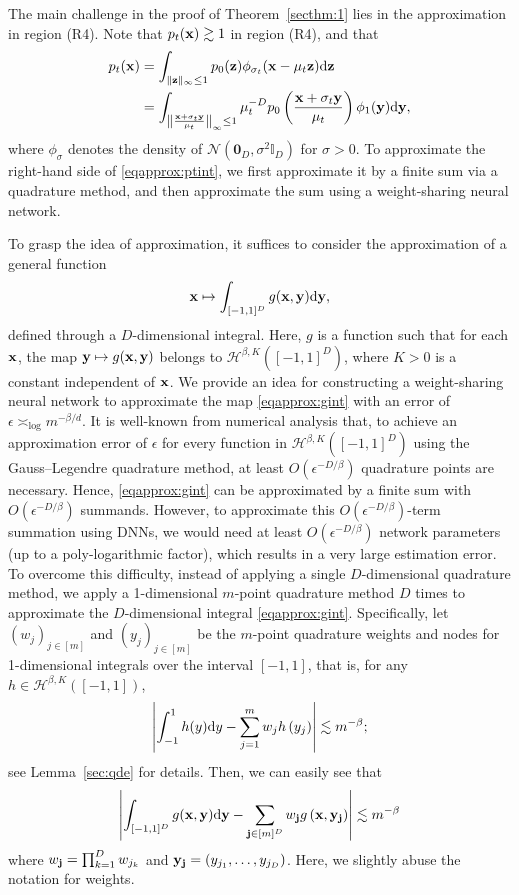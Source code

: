 \documentclass[twoside,11pt]{article}
\def\cH{\mathcal H}
\def\cN{\mathcal N}
\newcommand{\bj}{{\bf j}}
\newcommand{\bx}{{\bf x}}
\newcommand{\by}{{\bf y}}
\newcommand{\bz}{{\bf z}}
\newcommand{\bbI}{{\mathbb I}}
\newcommand{\be}{\begin{equation}}
\newcommand{\ee}{\end{equation}}
\newcommand{\bean}{\setlength\arraycolsep{1pt}\begin{eqnarray*}}
\newcommand{\eean}{\end{eqnarray*}}
\def\d{{\rm d}}
\begin{document}
The main challenge in the proof of Theorem~\ref{secthm:1} lies in the approximation in region (R4). Note that $p_{t}(\bx) \gtrsim 1$ in region (R4), and that
\be \begin{split}\label{eqapprox:ptint}
  p_t(\bx) &= \int_{\|\bz\|_{\infty} \leq 1} p_0(\bz) \phi_{\sigma_{t}}(\bx-\mu_t \bz) \d \bz
  \\
  &= \int_{\left\| \frac{ \bx + \sigma_{t} \by }{\mu_{t}}\right\|_{\infty} \leq 1} \mu_{t}^{-D} p_0 \left( \frac{\bx + \sigma_{t} \by}{\mu_{t}} \right) \phi_{1}(\by) \d \by,
\end{split}\ee
where $\phi_{\sigma}$ denotes the density of $\cN(\mathbf{0}_{D}, \sigma^2 \bbI_{D})$ for $\sigma > 0$.
To approximate the right-hand side of \eqref{eqapprox:ptint}, we first approximate it by a finite sum via a quadrature method, and then approximate the sum using a weight-sharing neural network.

To grasp the idea of approximation, it suffices to consider the approximation of a general function
\be \label{eqapprox:gint}
  \bx \mapsto \int_{[-1,1]^D} g(\bx,\by) \d \by,
\ee
defined through a $D$-dimensional integral. Here, $g$ is a function such that for each $\bx$, the map $\by \mapsto g(\bx, \by)$ belongs to $\cH^{\beta, K}([-1,1]^D)$, where $K > 0$ is a constant independent of $\bx$. We provide an idea for constructing a weight-sharing neural network to approximate the map \eqref{eqapprox:gint} with an error of $\epsilon \asymp_{\log} m^{-\beta/d}$. It is well-known from numerical analysis \citep{novak1988deterministic} that, to achieve an approximation error of $\epsilon$ for every function in $\cH^{\beta, K}([-1,1]^D)$ using the Gauss–Legendre quadrature method, at least $O(\epsilon^{-D/\beta})$ quadrature points are necessary. Hence, \eqref{eqapprox:gint} can be approximated by a finite sum with $O(\epsilon^{-D/\beta})$ summands. However, to approximate this $O(\epsilon^{-D/\beta})$-term summation using DNNs, we would need at least $O(\epsilon^{-D/\beta})$ network parameters (up to a poly-logarithmic factor), which results in a very large estimation error. To overcome this difficulty, instead of applying a single $D$-dimensional quadrature method, we apply a 1-dimensional $m$-point quadrature method $D$ times to approximate the $D$-dimensional integral \eqref{eqapprox:gint}. Specifically, let $(w_j)_{j \in [m]}$ and $(y_j)_{j \in [m]}$ be the $m$-point quadrature weights and nodes for 1-dimensional integrals over the interval $[-1, 1]$, that is, for any $h \in \cH^{\beta,K}([-1,1])$,
\bean
  \left\vert \int_{-1}^1 h(y) \d y
  - \sum_{j =1}^m w_j h \left( y_j \right) \right\vert
  \lesssim m^{-\beta}; 
\eean
see Lemma~\ref{sec:qde} for details. Then, we can easily see that 
\bean
  \left\vert \int_{[-1,1]^D} g (\bx, \by) \d \by
  - \sum_{\bj \in [m]^D} w_\bj g \left( \bx, \by_\bj \right) \right\vert
  \lesssim m^{-\beta}
\eean
where $w_\bj = \prod_{k=1}^D w_{j_k}$ and $\by_\bj = (y_{j_1}, \ldots, y_{j_D})$. Here, we slightly abuse the notation for weights.
\end{document}
